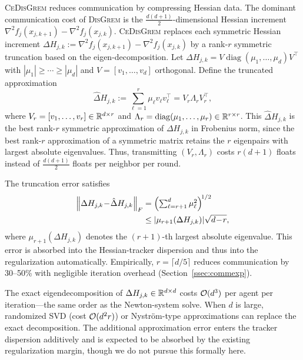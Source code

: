 \documentclass[review,onefignum,onetabnum]{siamart171218}
\begin{document}
\textsc{CeDisGrem} reduces communication by compressing Hessian data.
The dominant communication cost of \textsc{DisGrem} is the $\frac{d(d+1)}{2}$-dimensional
Hessian increment $\nabla^2 f_j(x_{j,k+1})-\nabla^2 f_j(x_{j,k})$.
\textsc{CeDisGrem} replaces each symmetric Hessian increment
$\Delta H_{j,k}:=\nabla^2 f_j(x_{j,k+1})-\nabla^2 f_j(x_{j,k})$
by a rank-$r$ symmetric truncation based on the eigen-decomposition.
Let $\Delta H_{j,k}=V\operatorname{diag}(\mu_1,\dots,\mu_d)V^\top$ with
$|\mu_1|\ge \cdots \ge |\mu_d|$ and $V=[v_1,\dots,v_d]$ orthogonal.
Define the truncated approximation
\[
\hat\Delta H_{j,k}:=\sum_{\ell=1}^r \mu_\ell v_\ell v_\ell^\top
= V_r\Lambda_r V_r^\top,
\]
where $V_r=[v_1,\dots,v_r]\in\mathbb{R}^{d\times r}$ and $\Lambda_r=\operatorname{diag}(\mu_1,\dots,\mu_r)\in\mathbb{R}^{r\times r}$.
This $\hat\Delta H_{j,k}$ is the best rank-$r$ symmetric approximation of $\Delta H_{j,k}$ in Frobenius norm,
since the best rank-$r$ approximation of a symmetric matrix retains the $r$ eigenpairs with largest absolute eigenvalues.
Thus, transmitting $(V_r,\Lambda_r)$ costs $r(d+1)$ floats instead of $\frac{d(d+1)}{2}$ floats per neighbor per round.

The truncation error satisfies
\begin{align*}
\left\|\Delta H_{j,k}\!-\!\hat\Delta H_{j,k}\right\|_F
&=\Bigl(\textstyle\sum_{\ell=r+1}^d \mu_\ell^2\Bigr)^{\!1/2}\\
&\le |\mu_{r+1}(\Delta H_{j,k})|\sqrt{d\!-\!r},
\end{align*}
where $\mu_{r+1}(\Delta H_{j,k})$ denotes the $(r+1)$-th largest absolute eigenvalue.
This error is absorbed into the Hessian-tracker dispersion and thus into the regularization automatically.
Empirically, $r=\lceil d/5\rceil$ reduces communication by 30--50\% with negligible iteration overhead
(Section~\ref{ssec:commexp}).

\begin{remark}
The exact eigendecomposition of $\Delta H_{j,k}\in\mathbb{R}^{d\times d}$
costs $\mathcal{O}(d^3)$ per agent per iteration---the same order as the
Newton-system solve.
When $d$ is large, randomized SVD
(cost $\mathcal{O}(d^2 r)$) or Nystr\"om-type approximations can replace
the exact decomposition.
The additional approximation error enters the tracker dispersion
additively and is expected to be absorbed by the existing
regularization margin, though we do not pursue this formally here.
\end{remark}
	
\end{document}
